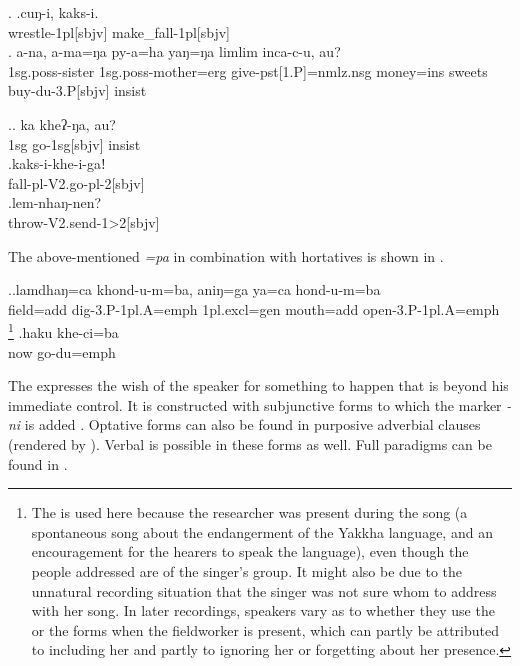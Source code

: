 \ex. \ag.cuŋ-i,    kaks-i.\\
wrestle{\sc -1pl[sbjv]} make\_fall{\sc -1pl[sbjv]}\\
 
\bg. a-na,     a-ma=ŋa                py-a=ha   yaŋ=ŋa    limlim inca-c-u,       au?\\
{\sc 1sg.poss-}sister {\sc 1sg.poss-}mother{\sc =erg} give{\sc -pst[1.P]=nmlz.nsg} money{\sc =ins} sweets buy{\sc -du-3.P[sbjv]} {\sc insist}\\
 

\ex.\ag. ka kheʔ-ŋa, au?\\
  {\sc 1sg} go{\sc -1sg[sbjv]} {\sc insist}\\
  \bg.kaks-i-khe-i-gaǃ\\
  fall{\sc -pl-V2.go-pl-2[sbjv]}\\
  \bg.lem-nhaŋ-nen?\\
  throw{\sc -V2.send-1>2[sbjv]}\\
  
The above-mentioned  \emph{=pa} in combination with hortatives is shown in \Next.
  
  \ex.\ag.lamdhaŋ=ca        khond-u-m=ba, aniŋ=ga ya=ca           hond-u-m=ba\\
 field{\sc =add} dig{\sc -3.P-1pl.A=emph} {\sc 1pl.excl=gen} mouth{\sc =add} open{\sc -3.P-1pl.A=emph}\\
 \footnote{The  is used here because the researcher was present during the song (a spontaneous song about the endangerment of the Yakkha language, and an encouragement for the hearers to speak the language), even though the people addressed are of the singer's group. It might also be due to the unnatural recording situation that the singer was not sure whom to address with her song. In later recordings, speakers vary as to whether they use the  or the  forms when the fieldworker is present, which can partly be attributed to including her and partly to ignoring her or forgetting about her presence.}  
  \bg.haku khe-ci=ba\\
  now go{\sc -du=emph}\\
  
  
  The  expresses the wish of the speaker for something to happen that is beyond his immediate control. It is constructed with subjunctive forms to which the marker \emph{-ni}  is added \Next. Optative forms can also be found in purposive adverbial clauses (rendered by ). Verbal  is possible in these forms as well. Full paradigms can be found in .
  
